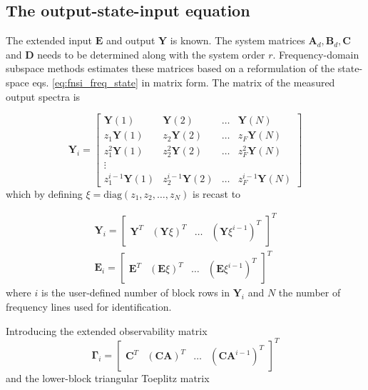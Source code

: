 \subsection{The output-state-input equation}

The extended input $\bm E$ and output $\bm Y$ is known. The system matrices $\bm
A_d, \bm B_d, \bm C$ and $\bm D$ needs to be determined along with the system
order $r$. Frequency-domain subspace methods estimates these matrices based on a
reformulation of the state-space eqs. \eqref{eq:fnsi_freq_state} in matrix form.
The matrix of the measured output spectra is

\begin{equation}
  \bm Y_i =
  \begin{bmatrix}
    \bm Y(1) & \bm Y(2) & \dots & \bm Y(N) \\
    z_1\bm Y(1) & z_2\bm Y(2) & \dots & z_F\bm Y(N) \\
    z^2_1\bm Y(1) & z^2_2\bm Y(2) & \dots & z^2_F\bm Y(N) \\
    \vdots \\
    z^{i-1}_1\bm Y(1) & z^{i-1}_2\bm Y(2) & \dots & z^{i-1}_F\bm Y(N)
  \end{bmatrix}
\end{equation}
which by defining $\xi = \text{diag}(z_1, z_2, \dots, z_N)$ is recast to

\begin{equation}
  \begin{aligned}
    \bm Y_i =
    \begin{bmatrix}
      \bm Y^T & (\bm Y \xi)^T & \dots & (\bm Y \xi^{i-1})^T
    \end{bmatrix}^T \\
    \bm E_i =
    \begin{bmatrix}
      \bm E^T & (\bm E \xi)^T & \dots & (\bm E \xi^{i-1})^T
    \end{bmatrix}^T
  \end{aligned}
\end{equation}
where $i$ is the user-defined number of block rows in $\bm Y_i$ and $N$ the
number of frequency lines used for identification.

Introducing the extended observability matrix
\begin{equation}
  \bm \Gamma_i =
  \begin{bmatrix}
    \bm C^T & (\bm C \bm A)^T & \dots & (\bm C \bm A^{i-1})^T
  \end{bmatrix}^T
\end{equation}
and the lower-block triangular Toeplitz matrix

